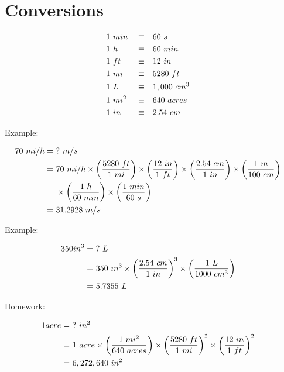 \section{Conversions}
	\begin{align}
		&1 \ min& &\equiv& &60 \ s& \notag \\
		&1 \ h& &\equiv& &60 \ min& \notag \\
		&1 \ ft& &\equiv& &12 \ in& \notag \\
		&1 \ mi& &\equiv& &5280 \ ft& \notag \\
		&1 \ L& &\equiv& &1,000 \ cm^{3}& \notag \\
		&1 \ mi^{2}& &\equiv& &640 \ acres& \notag \\
		&1 \ in& &\equiv& &2.54 \ cm& \notag
	\end{align}

	Example:

	\begin{align}
		70 \ mi/h = \ & ? \ m/s& \notag \\
		= \ & 70 \ mi/h
		\times \left( \frac{5280 \ ft}{1 \ mi} \right)
		\times \left( \frac{12 \ in}{1 \ ft} \right)
		\times \left( \frac{2.54 \ cm}{1 \ in} \right)
		\times \left( \frac{1 \ m}{100 \ cm} \right)& \notag \\
		&\times \left( \frac{1 \ h}{60 \ min} \right)
		\times \left( \frac{1 \ min}{60 \ s} \right)& \notag \\
		= \ & 31.2928 \ m/s& \notag
	\end{align}

	Example:

	\begin{align}
		350 in^{3} = \ & ? \ L& \notag \\
		= \ & 350 \ in^{3}
		\times \left( \frac{2.54 \ cm}{1 \ in} \right)^{3}
		\times \left( \frac{1 \ L}{1000 \ cm^{3}} \right)& \notag \\
		= \ & 5.7355 \ L& \notag
	\end{align}

	Homework:

	\begin{align}
		1 acre = \ & ? \ in^{2}& \notag \\
		= \ & 1 \ acre \times \left( \frac{1 \ mi^{2}}{640 \ acres} \right)
		\times \left( \frac{5280 \ ft}{1 \ mi} \right)^{2}
		\times \left( \frac{12 \ in}{1 \ ft} \right)^{2}& \notag \\
		= \ & 6,272,640 \ in^{2}& \notag
	\end{align}
